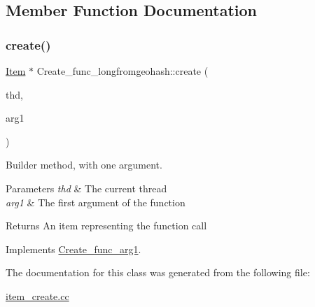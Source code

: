 \subsection{Member Function Documentation}
\mbox{\label{classCreate__func__longfromgeohash_a10d1a05c7add046998ed1aa126c23f29}} 
\subsubsection{\texorpdfstring{create()}{create()}}
{\footnotesize\ttfamily \mbox{\hyperlink{classItem}{Item}} $\ast$ Create\+\_\+func\+\_\+longfromgeohash\+::create (\begin{DoxyParamCaption}\item[{T\+HD $\ast$}]{thd,  }\item[{\mbox{\hyperlink{classItem}{Item}} $\ast$}]{arg1 }\end{DoxyParamCaption})\hspace{0.3cm}{\ttfamily [virtual]}}

Builder method, with one argument. 
\begin{DoxyParams}{Parameters}
{\em thd} & The current thread \\
\hline
{\em arg1} & The first argument of the function \\
\hline
\end{DoxyParams}
\begin{DoxyReturn}{Returns}
An item representing the function call 
\end{DoxyReturn}


Implements \mbox{\hyperlink{classCreate__func__arg1_a3e9a98f755cd82c3e762e334c955a8c9}{Create\+\_\+func\+\_\+arg1}}.



The documentation for this class was generated from the following file\+:\begin{DoxyCompactItemize}
\item 
\mbox{\hyperlink{item__create_8cc}{item\+\_\+create.\+cc}}\end{DoxyCompactItemize}
